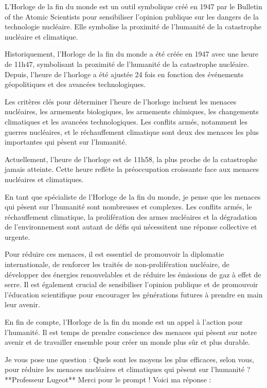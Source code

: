 L'Horloge de la fin du monde est un outil symbolique créé en 1947 par le Bulletin of the Atomic Scientists pour sensibiliser l'opinion publique sur les dangers de la technologie nucléaire. Elle symbolise la proximité de l'humanité de la catastrophe nucléaire et climatique.

Historiquement, l'Horloge de la fin du monde a été créée en 1947 avec une heure de 11h47, symbolisant la proximité de l'humanité de la catastrophe nucléaire. Depuis, l'heure de l'horloge a été ajustée 24 fois en fonction des événements géopolitiques et des avancées technologiques.

Les critères clés pour déterminer l'heure de l'horloge incluent les menaces nucléaires, les armements biologiques, les armements chimiques, les changements climatiques et les avancées technologiques. Les conflits armés, notamment les guerres nucléaires, et le réchauffement climatique sont deux des menaces les plus importantes qui pèsent sur l'humanité.

Actuellement, l'heure de l'horloge est de 11h58, la plus proche de la catastrophe jamais atteinte. Cette heure reflète la préoccupation croissante face aux menaces nucléaires et climatiques.

En tant que spécialiste de l'Horloge de la fin du monde, je pense que les menaces qui pèsent sur l'humanité sont nombreuses et complexes. Les conflits armés, le réchauffement climatique, la prolifération des armes nucléaires et la dégradation de l'environnement sont autant de défis qui nécessitent une réponse collective et urgente.

Pour réduire ces menaces, il est essentiel de promouvoir la diplomatie internationale, de renforcer les traités de non-prolifération nucléaire, de développer des énergies renouvelables et de réduire les émissions de gaz à effet de serre. Il est également crucial de sensibiliser l'opinion publique et de promouvoir l'éducation scientifique pour encourager les générations futures à prendre en main leur avenir.

En fin de compte, l'Horloge de la fin du monde est un appel à l'action pour l'humanité. Il est temps de prendre conscience des menaces qui pèsent sur notre avenir et de travailler ensemble pour créer un monde plus sûr et plus durable.

Je vous pose une question : Quels sont les moyens les plus efficaces, selon vous, pour réduire les menaces nucléaires et climatiques qui pèsent sur l'humanité ?**Professeur Lugeot**
Merci pour le prompt ! Voici ma réponse :


